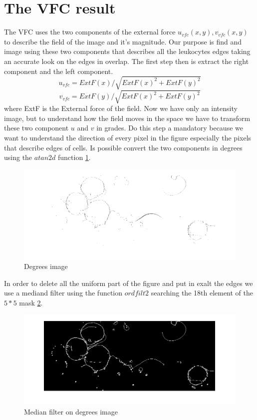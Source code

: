 \section{The VFC result}
The VFC uses the two components of the external force ${u} _{vfc} ( x,y ) , {v} _{vfc} (x,y)$ to describe the field of the image and it's magnitude. Our purpose is find and image using these two components that describes all the leukocytes edges taking an accurate look on the edges in overlap. The first step then is extract the right component and the left component.
\begin{equation}
{u} _{vfc}=ExtF(x)/\sqrt{ExtF(x)^{2} + ExtF(y)^{2}}
\end{equation}
\begin{equation}
{v} _{vfc}=ExtF(y)/\sqrt{ExtF(x)^{2} + ExtF(y)^{2}}
\end{equation}
where ExtF is the External force of the field. Now we have only an intensity image, but to understand how the field moves in the space we have to transform these two component $ u$ and $ v $ in grades. Do this step a mandatory because we want to understand the direction of every pixel in the figure especially the pixels that describe edges of cells. Is possible convert the two components in degrees using the $atan2d$ function \ref{fig:angle}.
\begin{figure}
	\begin{center}
		\centering
		\includegraphics[scale=0.5]{img/angle.png}
		\caption{Degrees image}
		\label{fig:angle}
	\end{center}
\end{figure}
In order to delete all the uniform part of the figure and put in exalt the edges we use a mediand filter using the function $ordfilt2$ searching the 18th element of the $5 * 5$ mask \ref{fig:Pmedangle}.
\begin{figure}
	\begin{center}
		\centering
		\includegraphics[scale=0.5]{img/PmedAngle.png}
		\caption{Median filter on degrees image}
		\label{fig:Pmedangle}
	\end{center}
\end{figure}
